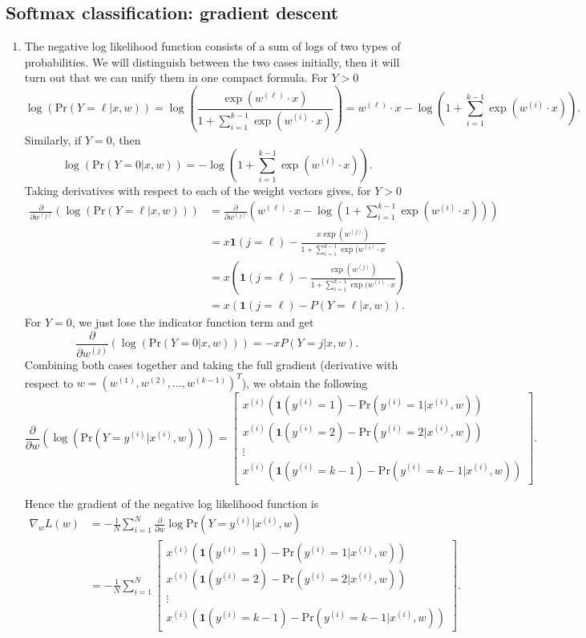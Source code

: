 \documentclass{article}
\newcommand{\bbm}{\begin{bmatrix}}
\newcommand{\ebm}{\end{bmatrix}}
\begin{document}
\subsection{Softmax classification: gradient descent}
\begin{enumerate}
	\item The negative log likelihood function consists of a sum of logs of two types of probabilities. We will distinguish between the two cases initially, then it will turn out that we can unify them in one compact formula. For $Y>0$
	\[
		\log(\mathrm{Pr}(Y=\ell|x,w)) = \log\left( \frac{\exp(w^{(\ell)}\cdot x)}{1+\sum^{k-1}_{i=1}\exp(w^{(i)}\cdot x)} \right) = w^{(\ell)}\cdot x - \log\left( 1+\sum^{k-1}_{i=1}\exp(w^{(i)}\cdot x)\right).
	\]
	Similarly, if $Y=0$, then 
	\[
		\log(\mathrm{Pr}(Y=0|x,w)) = - \log\left( 1+\sum^{k-1}_{i=1}\exp(w^{(i)}\cdot x)\right).
	\]
	Taking derivatives with respect to each of the weight vectors gives, for $Y>0$
	\begin{align*}
		\frac{\partial}{\partial w^{(j)}}\left(\log(\mathrm{Pr}(Y=\ell|x,w))\right) &= \frac{\partial}{\partial w^{(j)}}\left( w^{(\ell)}\cdot x - \log\left( 1+\sum^{k-1}_{i=1}\exp(w^{(i)}\cdot x)\right)\right)\\
		&=x\bm{1}(j=\ell) - \frac{x\exp(w^{(j)})}{1+\sum^{k-1}_{i=1}\exp(w^{(i)}\cdot x} \\
		&= x\left(\bm{1}(j=\ell) - \frac{\exp(w^{(j)})}{1+\sum^{k-1}_{i=1}\exp(w^{(i)}\cdot x}\right)\\
		&= x\left(\bm{1}(j=\ell) - P(Y=\ell|x,w)\right).
	\end{align*}
	For $Y=0$, we just lose the indicator function term and get
	\[
		\frac{\partial}{\partial w^{(j)}}\left(\log(\mathrm{Pr}(Y=0|x,w))\right) = -xP(Y=j|x,w).
	\]
	Combining both cases together and taking the full gradient (derivative with respect to $w = (w^{(1)},w^{(2)},\dots,w^{(k-1)})^T$), we obtain the following
	\[
		\frac{\partial}{\partial w}\left(\log(\mathrm{Pr}(Y=y^{(i)}|x^{(i)},w))\right) =
		\bbm	x^{(i)}\left(\bm{1}(y^{(i)}=1)-\mathrm{Pr}(y^{(i)}=1|x^{(i)},w) \right)\\
				x^{(i)}\left(\bm{1}(y^{(i)}=2)-\mathrm{Pr}(y^{(i)}=2|x^{(i)},w) \right)\\
				\vdots \\
				x^{(i)}\left(\bm{1}(y^{(i)}=k-1)-\mathrm{Pr}(y^{(i)}=k-1|x^{(i)},w) \right)
		\ebm.
	\]

	Hence the gradient of the negative log likelihood function is
	\begin{align*}
		\nabla_w L(w) &= -\frac1N\sum^N_{i=1}\frac{\partial}{\partial w}\log\mathrm{Pr}\left(Y=y^{(i)}|x^{(i)},w\right)\\
		&= -\frac1N\sum^N_{i=1}\bbm	x^{(i)}\left(\bm{1}(y^{(i)}=1)-\mathrm{Pr}(y^{(i)}=1|x^{(i)},w) \right)\\
				x^{(i)}\left(\bm{1}(y^{(i)}=2)-\mathrm{Pr}(y^{(i)}=2|x^{(i)},w) \right)\\
				\vdots \\
				x^{(i)}\left(\bm{1}(y^{(i)}=k-1)-\mathrm{Pr}(y^{(i)}=k-1|x^{(i)},w) \right)
		\ebm.
	\end{align*}



\end{enumerate}
\end{document}
